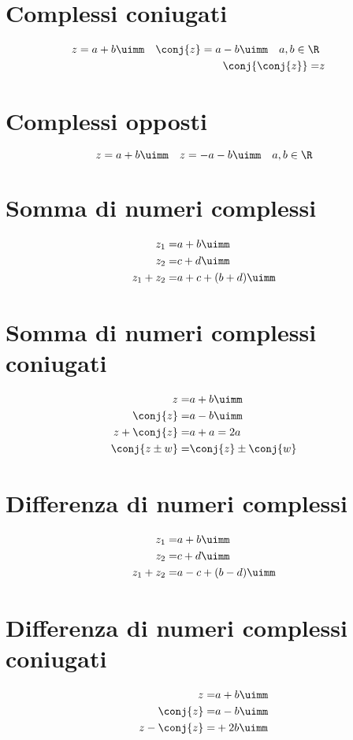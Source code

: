 \section{Complessi coniugati}
\begin{align*}
z=a+b\uimm\quad\conj{z}=a-b\uimm\quad a,b\in\R\\
\conj{\conj{z}}=&z\\
\end{align*}
\section{Complessi opposti}
\begin{equation*}
z=a+b\uimm\quad\-z=-a-b\uimm\quad a,b\in\R
\end{equation*}
\section{Somma di numeri complessi}
\begin{align*}
z_1=&a+b\uimm\\
z_2=&c+d\uimm\\
z_1+z_2=&a+c+(b+d)\uimm
\end{align*}
\section{Somma di numeri complessi coniugati}
\begin{align*}
z=&a+b\uimm\\
\conj{z}=&a-b\uimm\\
z+\conj{z}=&a+a=2a\\
\conj{z\pm w}=&\conj{z}\pm\conj{w}\\
\end{align*}
\section{Differenza di numeri complessi}
\begin{align*}
z_1=&a+b\uimm\\
z_2=&c+d\uimm\\
z_1+z_2=&a-c+(b-d)\uimm
\end{align*}
\section{Differenza di numeri complessi coniugati}
\begin{align*}
z=&a+b\uimm\\
\conj{z}=&a-b\uimm\\
z-\conj{z}=&+2b\uimm
\end{align*}
